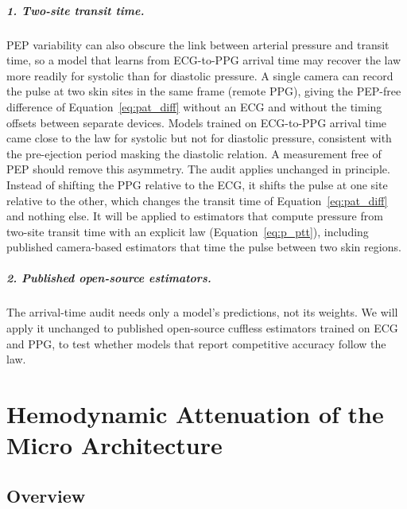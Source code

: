 \paragraph{1. Two-site transit time.}
PEP variability can also obscure the link between arterial pressure and transit time, so a model that learns from ECG-to-PPG arrival time may recover the law more readily for systolic than for diastolic pressure. A single camera can record the pulse at two skin sites in the same frame (remote PPG), giving the PEP-free difference of Equation~\eqref{eq:pat_diff} without an ECG and without the timing offsets between separate devices. Models trained on ECG-to-PPG arrival time came close to the law for systolic but not for diastolic pressure, consistent with the pre-ejection period masking the diastolic relation. A measurement free of PEP should remove this asymmetry. The audit applies unchanged in principle. Instead of shifting the PPG relative to the ECG, it shifts the pulse at one site relative to the other, which changes the transit time of Equation~\eqref{eq:pat_diff} and nothing else. It will be applied to estimators that compute pressure from two-site transit time with an explicit law (Equation~\eqref{eq:p_ptt}), including published camera-based estimators that time the pulse between two skin regions.

\paragraph{2. Published open-source estimators.}
The arrival-time audit needs only a model's predictions, not its weights. We will apply it unchanged to published open-source cuffless estimators trained on ECG and PPG, to test whether models that report competitive accuracy follow the law.




\chapter{Hemodynamic Attenuation of the Micro Architecture}
\label{ch:micro}
\setcounter{figure}{0}

\section{Overview}
\label{sec:ha}

